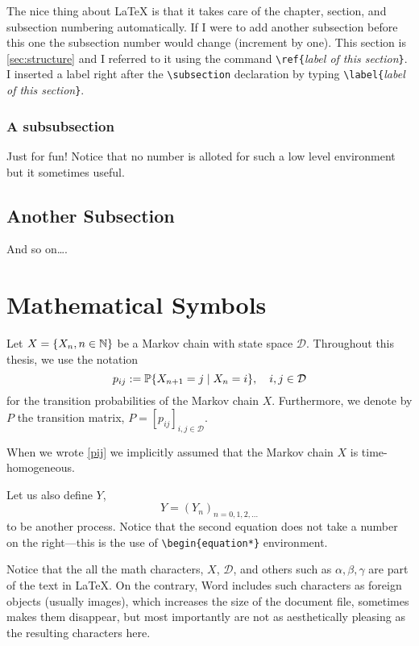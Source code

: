 The nice thing about \LaTeX{} is that it takes care of the chapter,
section, and subsection numbering automatically. If I were to add
another subsection before this one the subsection number would
change (increment by one). This section is \ref{sec:structure} and I
referred to it using the command \verb|\ref{|\emph{label of this
section}\verb|}|. I inserted a label right after the
\verb|\subsection| declaration by typing \verb|\label{|\emph{label
of this section}\verb|}|.

\subsubsection{A subsubsection}\label{subsub} Just for fun! Notice
that no number is alloted for such a low level environment but it
sometimes useful.

\subsection{Another Subsection}
And so on\ldots.

\section{Mathematical Symbols}
Let $X=\{X_n, n\in \mathbb{N}\}$ be a Markov chain with state space
$\mathcal{D}$. Throughout this thesis, we use the notation
\begin{equation}
p_{ij} := \P\{X_{n+1} = j \mid X_n = i\}, \quad i,j \in \mathcal{D}
\label{pij}
\end{equation}
for the transition probabilities of the Markov chain $X$.
Furthermore, we denote by $P$ the transition matrix, $P =
[p_{ij}]_{i,j\in\mathcal{D}}$.

When we wrote \eqref{pij} we implicitly assumed that the Markov
chain $X$ is time-homogeneous.

Let us also define $Y$,
\begin{equation*}
Y = (Y_n)_{n = 0,1,2,\ldots}
\end{equation*}
to be another process. Notice that the second equation does not take
a number on the right---this is the use of \verb|\begin{equation*}|
environment.

Notice that the all the math characters, $X$, $\mathcal{D}$, and
others such as $\alpha, \beta, \gamma$ are part of the text in
\LaTeX{}. On the contrary, Word includes such characters as foreign
objects (usually images), which increases the size of the document
file, sometimes makes them disappear, but most importantly are not
as aesthetically pleasing as the resulting characters here.


